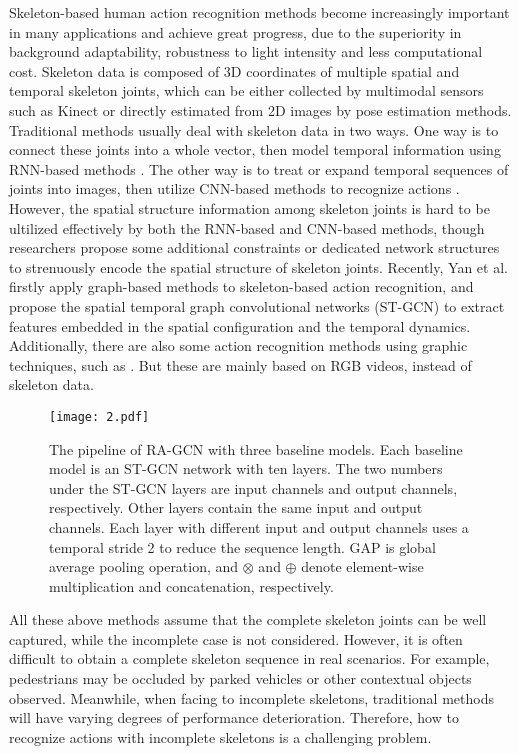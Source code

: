 \documentclass{article}
\begin{document}
Skeleton-based human action recognition methods become increasingly important in many applications and achieve great progress, due to the superiority in background adaptability, robustness to light intensity and less computational cost. Skeleton data is composed of 3D coordinates of multiple spatial and temporal skeleton joints, which can be either collected by multimodal sensors such as Kinect or directly estimated from 2D images by pose estimation methods. Traditional methods usually deal with skeleton data in two ways. One way is to connect these joints into a whole vector, then model temporal information using RNN-based methods \cite{Liu2016, Zhang2017, Zhang2017b, Wang2017, Si2018}. The other way is to treat or expand temporal sequences of joints into images, then utilize CNN-based methods to recognize actions \cite{Li2017b, Kim2017, Ding2017, Li2018, Tang2018}. However, the spatial structure information among skeleton joints is hard to be ultilized effectively by both the RNN-based and CNN-based methods, though researchers propose some additional constraints or dedicated network structures to strenuously encode the spatial structure of skeleton joints. Recently, Yan et al.\cite{Yan2018} firstly apply graph-based methods to skeleton-based action recognition, and propose the spatial temporal graph convolutional networks (ST-GCN) to extract features embedded in the spatial configuration and the temporal dynamics. Additionally, there are also some action recognition methods using graphic techniques, such as \cite{Wang2013, Wang2014a, Wang2014b}. But these are mainly based on RGB videos, instead of skeleton data.

\begin{figure*}[t]
\label{fig:2}
\centerline{\texttt{[image: 2.pdf]}}
\caption{The pipeline of RA-GCN with three baseline models. Each baseline model is an ST-GCN network with ten layers. The two numbers under the ST-GCN layers are input channels and output channels, respectively. Other layers contain the same input and output channels. Each layer with different input and output channels uses a temporal stride 2 to reduce the sequence length. GAP is global average pooling operation, and $\otimes$ and $\oplus$ denote element-wise multiplication and concatenation, respectively.}
\vspace{-0.2cm}
\end{figure*}

All these above methods assume that the complete skeleton joints can be well captured, while the incomplete case is not considered. However, it is often difficult to obtain a complete skeleton sequence in real scenarios. For example, pedestrians may be occluded by parked vehicles or other contextual objects observed. Meanwhile, when facing to incomplete skeletons, traditional methods will have varying degrees of performance deterioration. Therefore, how to recognize actions with incomplete skeletons is a challenging problem.
\end{document}
